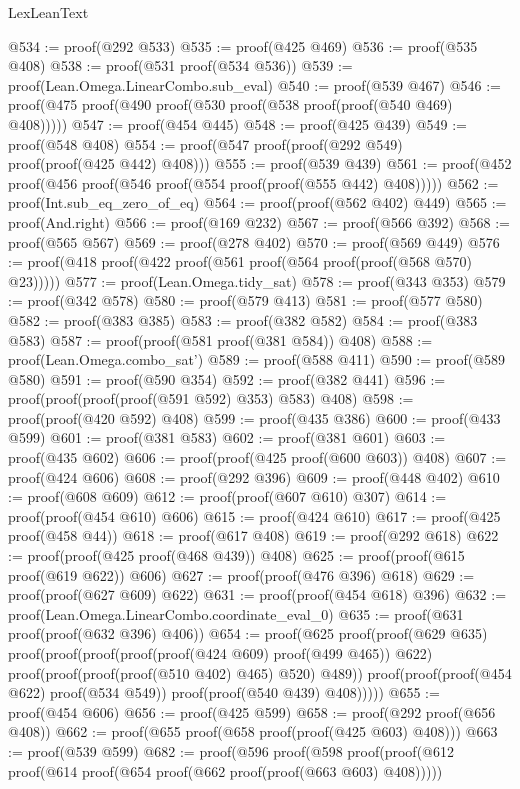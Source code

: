 \begin{lexlean}{LexLeanText}
\begin{coremodule}
@534 := proof(@292 @533)
@535 := proof(@425 @469)
@536 := proof(@535 @408)
@538 := proof(@531 proof(@534 @536))
@539 := proof(Lean.Omega.LinearCombo.sub_eval)
@540 := proof(@539 @467)
@546 := proof(@475 proof(@490 proof(@530 proof(@538 proof(proof(@540 @469) @408)))))
@547 := proof(@454 @445)
@548 := proof(@425 @439)
@549 := proof(@548 @408)
@554 := proof(@547 proof(proof(@292 @549) proof(proof(@425 @442) @408)))
@555 := proof(@539 @439)
@561 := proof(@452 proof(@456 proof(@546 proof(@554 proof(proof(@555 @442) @408)))))
@562 := proof(Int.sub_eq_zero_of_eq)
@564 := proof(proof(@562 @402) @449)
@565 := proof(And.right)
@566 := proof(@169 @232)
@567 := proof(@566 @392)
@568 := proof(@565 @567)
@569 := proof(@278 @402)
@570 := proof(@569 @449)
@576 := proof(@418 proof(@422 proof(@561 proof(@564 proof(proof(@568 @570) @23)))))
@577 := proof(Lean.Omega.tidy_sat)
@578 := proof(@343 @353)
@579 := proof(@342 @578)
@580 := proof(@579 @413)
@581 := proof(@577 @580)
@582 := proof(@383 @385)
@583 := proof(@382 @582)
@584 := proof(@383 @583)
@587 := proof(proof(@581 proof(@381 @584)) @408)
@588 := proof(Lean.Omega.combo_sat')
@589 := proof(@588 @411)
@590 := proof(@589 @580)
@591 := proof(@590 @354)
@592 := proof(@382 @441)
@596 := proof(proof(proof(proof(@591 @592) @353) @583) @408)
@598 := proof(proof(@420 @592) @408)
@599 := proof(@435 @386)
@600 := proof(@433 @599)
@601 := proof(@381 @583)
@602 := proof(@381 @601)
@603 := proof(@435 @602)
@606 := proof(proof(@425 proof(@600 @603)) @408)
@607 := proof(@424 @606)
@608 := proof(@292 @396)
@609 := proof(@448 @402)
@610 := proof(@608 @609)
@612 := proof(proof(@607 @610) @307)
@614 := proof(proof(@454 @610) @606)
@615 := proof(@424 @610)
@617 := proof(@425 proof(@458 @44))
@618 := proof(@617 @408)
@619 := proof(@292 @618)
@622 := proof(proof(@425 proof(@468 @439)) @408)
@625 := proof(proof(@615 proof(@619 @622)) @606)
@627 := proof(proof(@476 @396) @618)
@629 := proof(proof(@627 @609) @622)
@631 := proof(proof(@454 @618) @396)
@632 := proof(Lean.Omega.LinearCombo.coordinate_eval_0)
@635 := proof(@631 proof(proof(@632 @396) @406))
@654 := proof(@625
      proof(proof(@629 @635)
          proof(proof(proof(proof(proof(@424 @609) proof(@499 @465)) @622)
                proof(proof(proof(proof(@510 @402) @465) @520) @489))
              proof(proof(proof(@454 @622) proof(@534 @549)) proof(proof(@540 @439) @408)))))
@655 := proof(@454 @606)
@656 := proof(@425 @599)
@658 := proof(@292 proof(@656 @408))
@662 := proof(@655 proof(@658 proof(proof(@425 @603) @408)))
@663 := proof(@539 @599)
@682 := proof(@596
      proof(@598
          proof(proof(@612 proof(@614 proof(@654 proof(@662 proof(proof(@663 @603) @408)))))

\end{coremodule}
\end{lexlean}
